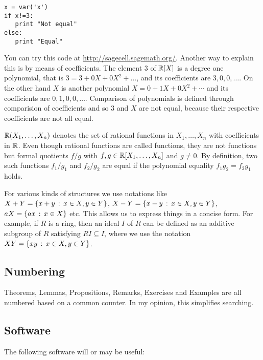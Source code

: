 \begin{verbatim}
x = var('x')
if x!=3:
   print "Not equal"
else:
   print "Equal"
\end{verbatim}

You can try this code at \url{http://sagecell.sagemath.org/}. Another way to explain this is by means of coefficients. The element $3$ of $\mathbb{R}[X]$ is a degree one polynomial, that is $3 = 3 + 0 X + 0 X^2 + \ldots $, and its coefficients are $3, 0, 0, \ldots$. On the other hand $X$ is another polynomial $X = 0  + 1 X + 0 X^2 + \cdots$ and its coefficients are $0, 1,0 , 0, \ldots$. Comparison of polynomials is defined through comparision of coefficients and so $3$ and $X$ are not equal, because their respective coefficients are not all equal. 

$\mathbb{R}(X_1,\ldots,X_n)$ denotes the set of rational functions in $X_1,\ldots,X_n$ with coefficients in $\mathbb{R}$. Even though rational functions are called functions, they are not functions but formal quotients $f/g$ with $f, g \in \mathbb{R}[X_1,\ldots,X_n]$ and $g \ne 0$. By definition, two such functions $f_1/ g_1$ and $f_2/g_2$ are equal if the polynomial equality $f_1 g_2 = f_2 g_1$ holds. 

For various kinds of structures we use notations like $X + Y = \left\{  x + y \,:\, x \in X, y \in Y \right\}$, $X - Y = \left\{ x - y \,:\, x \in X, y \in Y \right\}$, $a X = \left\{  a x  \,:\, x \in X \right\}$ etc. This allows us to express things in a concise form. For example, if $R$ is a ring, then an ideal $I$ of $R$ can be defined as an additive subgroup of $R$ satisfying $R I \subseteq I$, where we use the notation $X Y = \left\{ x y  \,:\, x \in  X, y \in Y \right\}$. 


\subsection{Numbering}

Theorems, Lemmas, Propositions, Remarks, Exercises and Examples are all numbered based on a common counter. In my opinion, this simplifies searching. 

\subsection{Software}

The following software will or may be useful:

